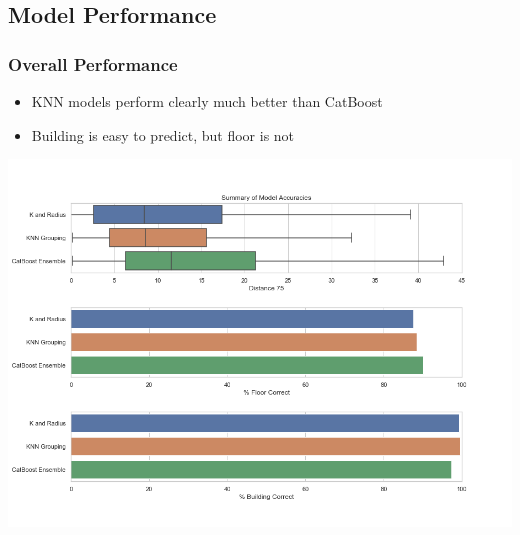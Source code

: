 \documentclass[10pt]{beamer}
\begin{document}
\subsection{Model Performance}

\begin{frame}
\frametitle{Overall Performance}

\begin{itemize}
    \item KNN models perform clearly much better than CatBoost
    \item Building is easy to predict, but floor is not
\end{itemize}

\includegraphics[width=\textwidth,height=\textheight,keepaspectratio]{error_summary.png}

\end{frame}
\end{document}
